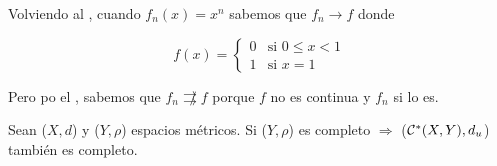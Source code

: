 \begin{remark}
    Volviendo al , cuando $f_n(x) = x^n$ sabemos que $f_n \to f$ donde 

    $$ f(x) = \begin{cases}
              0 & \text{si }  0 \leqslant x < 1\\
              1 & \text{si } x = 1
     \end{cases}$$

     Pero po el , sabemos que $f_n \not \rightrightarrows f $ porque $f$ no es continua y $f_n$ si lo es.
\end{remark}

\begin{theorem}
    Sean ($X,d$) y ($Y,\rho$) espacios métricos. Si ($Y,\rho$) es completo $\Rightarrow$ (${\mathcal{C}}^{\ast}(X,Y), d_u$) también es completo.
\end{theorem}

